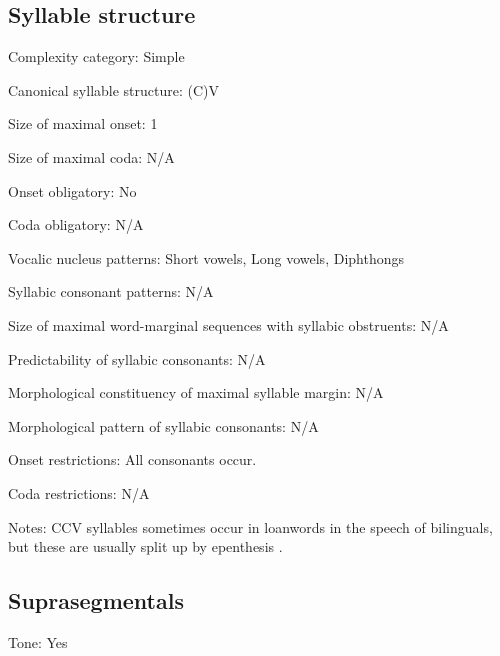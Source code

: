 {\subsection*{Syllable structure}
\begin{appendixdesc}

\item[Complexity category:] Simple

\item[Canonical syllable structure:] (C)V \citep[75--76]{Olawsky2006}

\item[Size of maximal onset:] 1

\item[Size of maximal coda:] N/A

\item[Onset obligatory:] No

\item[Coda obligatory:] N/A

\item[Vocalic nucleus patterns:] Short vowels, Long vowels, Diphthongs

\item[Syllabic consonant patterns:] N/A

\item[Size of maximal word-marginal sequences with syllabic obstruents:] N/A

\item[Predictability of syllabic consonants:] N/A

\item[Morphological constituency of maximal syllable margin:] N/A

\item[Morphological pattern of syllabic consonants:] N/A

\item[Onset restrictions:] All consonants occur.

\item[Coda restrictions:] N/A

\item[Notes:] CCV syllables sometimes occur in  loanwords in the speech of bilinguals, but these are usually split up by epenthesis \citep[76]{Olawsky2006}.
\end{appendixdesc}
\subsection*{Suprasegmentals}
\begin{appendixdesc}
\item[Tone:] Yes


\end{appendixdesc}}
